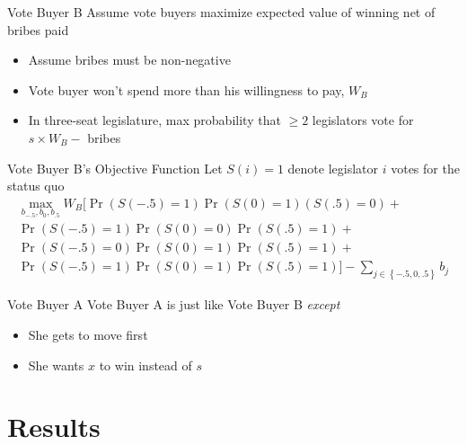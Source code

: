 \documentclass{beamer}
\begin{document}
\begin{frame}{Vote Buyer B}
\pause
Assume vote buyers maximize expected value of winning net of bribes paid  
\pause
\begin{itemize}[<+->]
	\item Assume bribes must be non-negative
	\item Vote buyer won't spend more than his willingness to pay, $W_B$
	\item In three-seat legislature, max probability that $\geq 2$ legislators vote for $s \times W_B -$ bribes
\end{itemize}
\end{frame}

\begin{frame}{Vote Buyer B's Objective Function}
\pause
Let $S(i) = 1$ denote legislator $i$ votes for the status quo
\pause
\begin{multline*}
			    \max_{b_{-.5}, b_0, b_{.5}} 
					W_B \biggl[ \Pr\left(S\left(-.5\right)=1\right)\Pr\left(S\left(0\right)=1\right)\left(S\left(.5\right)=0\right)  + \\
					\Pr\left(S\left(-.5\right)=1\right)\Pr\left(S\left(0\right)=0\right)\Pr\left(S\left(.5\right)=1\right) + \\
					\Pr\left(S\left(-.5\right)=0\right)\Pr\left(S\left(0\right)=1\right)\Pr\left(S\left(.5\right)=1\right) + \\
					\Pr\left(S\left(-.5\right)=1\right)\Pr\left(S\left(0\right)=1\right)\Pr\left(S\left(.5\right)=1\right) \biggr] - \sum_{j\in \left\{-.5, 0,.5\right\}} b_j
				\end{multline*}
\end{frame}


\begin{frame}{Vote Buyer A}
\pause
Vote Buyer A is just like Vote Buyer B \textit{except}
\pause
\begin{itemize}[<+->]
	\item She gets to move first
	\item She wants $x$ to win instead of $s$
\end{itemize}
\end{frame}





\section{Results}
\end{document}
